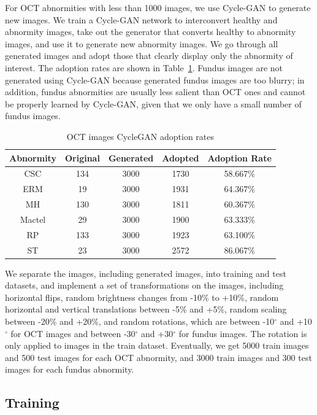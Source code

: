 \documentclass{article}
\begin{document}
	For OCT abnormities with less than 1000 images, we use Cycle-GAN\autocite{Zhu_Park_Isola_Efros_2020} to generate new images. We train a Cycle-GAN network to interconvert healthy and abnormity images, take out the generator that converts healthy to abnormity images, and use it to generate new abnormity images. We go through all generated images and adopt those that clearly display only the abnormity of interest. The adoption rates are shown in Table~\ref{tb:cycleGAN_number}. Fundus images are not generated using Cycle-GAN because generated fundus images are too blurry; in addition, fundus abnormities are usually less salient than OCT ones and cannot be properly learned by Cycle-GAN, given that we only have a small number of fundus images.
	
	{
		\fontsize{9}{12}\selectfont
		{
			\begin{longtable}{ccccc}
				\caption{OCT images CycleGAN adoption rates}
				\label{tb:cycleGAN_number}\\
				\toprule
				Abnormity&Original&Generated&Adopted&Adoption Rate\\
				\midrule
				CSC   &134&3000&1730&58.667\% \\
				ERM   &19 &3000&1931&64.367\% \\
				MH    &130&3000&1811&60.367\% \\
				Mactel&29 &3000&1900&63.333\% \\
				RP    &133&3000&1923&63.100\% \\
				ST    &23 &3000&2572&86.067\% \\
				\bottomrule
			\end{longtable}
		}
	}
	
	We separate the images, including generated images, into training and test datasets, and implement a set of transformations on the images, including horizontal flips, random brightness changes from -10\% to +10\%, random horizontal and vertical translations between -5\% and +5\%, random scaling between -20\% and +20\%, and random rotations, which are between -10$^\circ$ and +10$^\circ$ for OCT images and between -30$^\circ$ and +30$^\circ$ for fundus images. The rotation is only applied to images in the train dataset. Eventually, we get 5000 train images and 500 test images for each OCT abnormity, and 3000 train images and 300 test images for each fundus abnormity.
	
	\subsection{Training}
	
\end{document}

